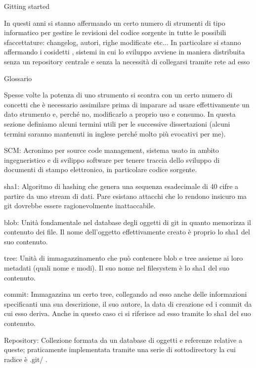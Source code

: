 \capitolo Gitting started

In questi anni si stanno affermando un certo numero di strumenti di tipo
informatico per gestire le revisioni del codice sorgente in tutte le possibili
sfaccettature: changelog, autori, righe modificate etc... In particolare si
stanno affermando i cosidetti , sistemi
in cui lo sviluppo avviene in maniera distribuita senza un repository centrale e
senza la necessit\`a di collegarsi tramite rete ad esso

\sezione Glossario

Spesse volte la potenza di uno strumento si scontra con un certo numero di
concetti che \`e necessario assimilare prima di imparare ad usare
effettivamente un dato strumento e, perch\'e no, modificarlo a proprio uso e
consumo. In questa sezione definiamo alcuni termini utili per le successive
dissertazioni (alcuni termini saranno mantenuti in inglese perch\'e molto pi\`u
evocativi per me).
\medskip

\elemento SCM: Acronimo per source code management, sistema usato in ambito
ingegneristico e di svilippo software per tenere traccia dello sviluppo di
documenti di stampo elettronico, in particolare codice sorgente.

\elemento sha1: Algoritmo di hashing che genera una sequenza esadecimale di 40
cifre a partire da uno stream di dati. Pare esistano attacchi che lo rendono
insicuro ma git dovrebbe essere ragionevolmente inattaccabile.

\elemento blob: Unit\`a fondamentale nel database degli oggetti di git in quanto
memorizza il contenuto dei file. Il nome dell'oggetto effettivamente creato \`e
proprio lo sha1 del suo contenuto.

\elemento tree: Unit\`a di immagazzinamento che pu\`o contenere blob e tree
assieme ai loro metadati (quali nome e modi). Il suo nome nel filesystem \`e lo
sha1 del suo contenuto.

\elemento commit: Immagazzina un certo tree, collegando ad esso anche delle
informazioni specificanti una sua descrizione, il suo autore, la data di
creazione ed i commit da cui esso deriva. Anche in questo caso ci si riferisce
ad esso tramite lo sha1 del suo contenuto.

\elemento Repository: Collezione formata da un database di oggetti e referenze
relative a queste; praticamente implementata tramite una serie di sottodirectory
la cui radice \`e \verbatim .git/ \endverbatim.

